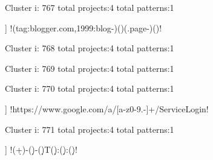 Cluster i: 767
total projects:4
total patterns:1
\begin{multicols}{1}
\begin{description}[noitemsep,topsep=0pt]
\item [[4] ] \cverb!(tag:blogger.com,1999:blog-)(\w*)(.page-)(\w*)!
\end{description}
\end{multicols}







Cluster i: 768
total projects:4
total patterns:1
\begin{multicols}{1}
\end{multicols}







Cluster i: 769
total projects:4
total patterns:1
\begin{multicols}{1}
\end{multicols}







Cluster i: 770
total projects:4
total patterns:1
\begin{multicols}{1}
\begin{description}[noitemsep,topsep=0pt]
\item [[4] ] \cverb!https://www.google.com/a/[a-z0-9.-]+/ServiceLogin!
\end{description}
\end{multicols}







Cluster i: 771
total projects:4
total patterns:1
\begin{multicols}{1}
\begin{description}[noitemsep,topsep=0pt]
\item [[4] ] \cverb!(\d+)-(\d\d)-(\d\d)T(\d\d):(\d\d):(\d\d)!
\end{description}
\end{multicols}







